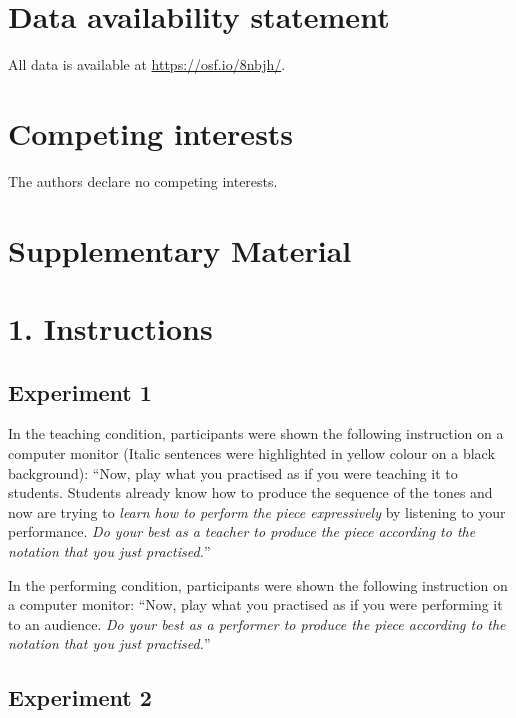 \documentclass[
  man,floatsintext]{apa6}
\begin{document}
\hypertarget{data-availability-statement}{%
\section{Data availability statement}\label{data-availability-statement}}

All data is available at \url{https://osf.io/8nbjh/}.

\hypertarget{competing-interests}{%
\section{Competing interests}\label{competing-interests}}

The authors declare no competing interests.

\clearpage

\hypertarget{supplementary}{%
\section{Supplementary Material}\label{supplementary}}

\hypertarget{instructions}{%
\section{1. Instructions}\label{instructions}}

\hypertarget{experiment-1-1}{%
\subsection{Experiment 1}\label{experiment-1-1}}

In the teaching condition, participants were shown the following instruction on a computer monitor (Italic sentences were highlighted in yellow colour on a black background): ``Now, play what you practised as if you were teaching it to students. Students already know how to produce the sequence of the tones and now are trying to \emph{learn how to perform the piece expressively} by listening to your performance. \emph{Do your best as a teacher to produce the piece according to the notation that you just practised.}''

In the performing condition, participants were shown the following instruction on a computer monitor: ``Now, play what you practised as if you were performing it to an audience. \emph{Do your best as a performer to produce the piece according to the notation that you just practised.}''

\hypertarget{experiment-2-1}{%
\subsection{Experiment 2}\label{experiment-2-1}}
\end{document}
